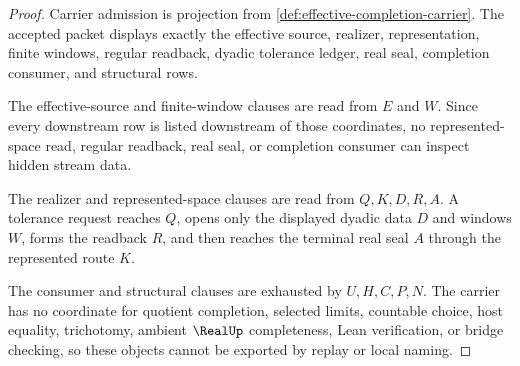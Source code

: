 \begin{proof}
Carrier admission is projection from \autoref{def:effective-completion-carrier}. The accepted packet displays exactly the effective source, realizer, representation, finite windows, regular readback, dyadic tolerance ledger, real seal, completion consumer, and structural rows.

The effective-source and finite-window clauses are read from $E$ and $W$. Since every downstream row is listed downstream of those coordinates, no represented-space read, regular readback, real seal, or completion consumer can inspect hidden stream data.

The realizer and represented-space clauses are read from $Q,K,D,R,A$. A tolerance request reaches $Q$, opens only the displayed dyadic data $D$ and windows $W$, forms the readback $R$, and then reaches the terminal real seal $A$ through the represented route $K$.

The consumer and structural clauses are exhausted by $U,H,C,P,N$. The carrier has no coordinate for quotient completion, selected limits, countable choice, host equality, trichotomy, ambient $\RealUp$ completeness, Lean verification, or bridge checking, so these objects cannot be exported by replay or local naming.
\end{proof}

